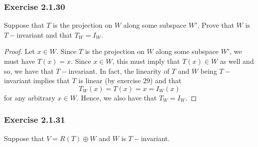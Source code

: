 \subsubsection{Exercise 2.1.30} Suppose that \( T  \) is the projection on \( W  \) along some subspace \( W'  \). Prove that \( W  \) is \( T- \)invariant and that \( T_{W} = I_{W} \).
\begin{proof}
Let \( x \in W  \). Since \( T  \) is the projection on \( W  \) along some subspace \( W' \), we must have \( T(x) = x  \). Since \( x \in W  \), this must imply that \( T(x) \in W   \) as well and so, we have that \( T- \)invariant. In fact, the linearity of \( T  \) and \( W  \) being \( T- \)invariant implies that \( T  \) is linear (by exercise 29) and that 
\[  T_{W}(x) = T(x) = x = I_{W}(x) \]
for any arbitrary \( x \in W  \). Hence, we also have that \( T_{W} = I_{W} \).
\end{proof}

\subsubsection{Exercise 2.1.31} Suppose that \( V = R(T) \oplus W  \) and \( W  \) is \( T- \)invariant. 

